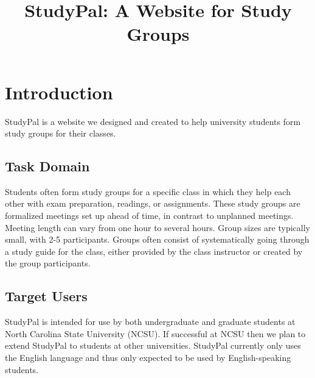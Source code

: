 \documentclass[conference]{IEEEtran}
\begin{document}
\title{StudyPal: A Website for Study Groups}

\author{
\and
{}
}


\maketitle


\begin{abstract}
\blindtext[1]
\end{abstract}

\IEEEpeerreviewmaketitle



\section{Introduction}
StudyPal is a website we designed and created to help university students form study groups for their classes.


\subsection{Task Domain}
Students often form study groups for a specific class in which they help each other with exam preparation, readings, or assignments.
These study groups are formalized meetings set up ahead of time, in contrast to unplanned meetings.
Meeting length can vary from one hour to several hours.
Group sizes are typically small, with 2-5 participants.
Groups often consist of systematically going through a study guide for the class, either provided by the class instructor or created by the group participants.


\subsection{Target Users}
StudyPal is intended for use by both undergraduate and graduate students at North Carolina State University (NCSU).
If successful at NCSU then we plan to extend StudyPal to students at other universities.
StudyPal currently only uses the English language and thus only expected to be used by English-speaking students.
\end{document}

